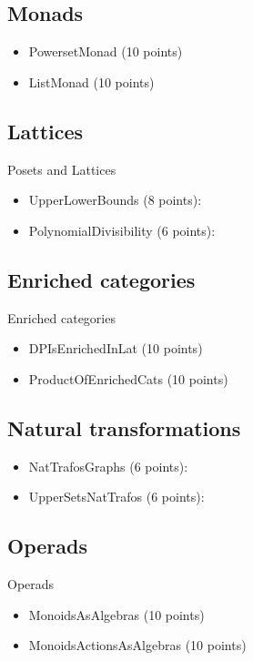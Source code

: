 \subsection{Monads}

\begin{itemize}
    \item PowersetMonad (10 points)  
    \item ListMonad (10 points) 
\end{itemize}

\subsection{Lattices}

Posets and Lattices
\begin{itemize}
    \item UpperLowerBounds (8 points): 
    \item PolynomialDivisibility (6 points):  
\end{itemize}

\subsection{Enriched categories}
Enriched categories
\begin{itemize}
    \item DPIsEnrichedInLat (10 points)  
    \item ProductOfEnrichedCats (10 points) 
\end{itemize}

\subsection{Natural transformations}

\begin{itemize}
    \item NatTrafosGraphs (6 points): 
    \item UpperSetsNatTrafos (6 points): 
\end{itemize}

\subsection{Operads}

Operads
\begin{itemize}
    \item MonoidsAsAlgebras (10 points)  
    \item MonoidsActionsAsAlgebras (10 points) 
\end{itemize}

